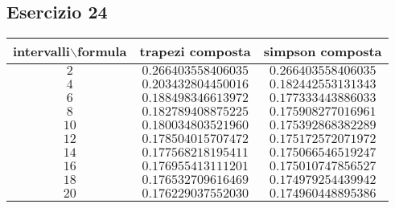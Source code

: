 \subsection{Esercizio 24}
\begin{tabular}{|c c c |}
    \hline
    intervalli$\backslash$formula & trapezi composta        &simpson composta\\
    \hline
    $2$                           &$0.266403558406035$        &$0.266403558406035$ \\
    \hline
    $4$                           &$0.203432804450016$        &$0.182442553131343$ \\
    \hline
    $6$                           &$0.188498346613972$        &$0.177333443886033$ \\
    \hline
    $8$                           &$0.182789408875225$        &$0.175908277016961$ \\
    \hline
    $10$                          &$0.180034803521960$        &$0.175392868382289$ \\
    \hline
    $12$                          &$0.178504015707472$        &$0.175172572071972$ \\
    \hline
    $14$                          &$0.177568218195411$        &$0.175066546519247$ \\
    \hline
    $16$                          &$0.176955413111201$        &$0.175010747856527$ \\
    \hline
    $18$                          &$0.176532709616469$        &$0.174979254439942$ \\
    \hline
    $20$                          &$0.176229037552030$        &$0.174960448895386$ \\
    \hline
\end{tabular}
